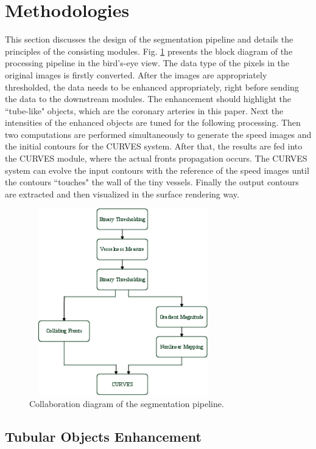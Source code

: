 \section{Methodologies}
\label{sec4_1}

This section discusses the design of the segmentation pipeline and details the principles of the consisting modules.
Fig. \ref{fig:DataFlow} presents the block diagram of the processing pipeline in the bird's-eye view.
The data type of the pixels in the original images is firstly converted.
After the images are appropriately thresholded, the data needs to be enhanced appropriately, right before sending the data to the downstream modules.
The enhancement should highlight the ``tube-like" objects, which are the coronary arteries in this paper.
Next the intensities of the enhanced objects are tuned for the following processing.
Then two computations are performed simultaneously to generate the speed images and the initial contours for the CURVES system.
After that, the results are fed into the CURVES module, where the actual fronts propagation occurs.
The CURVES system can evolve the input contours with the reference of the speed images until the contours ``touches" the wall of the tiny vessels.
Finally the output contours are extracted and then visualized in the surface rendering way.
\begin{figure}[t]
\centering
\includegraphics[height=3.2in,width=3.2in]{Figures/chap04/DataFlow.png}
\caption{Collaboration diagram of the segmentation pipeline.}
\label{fig:DataFlow}
\end{figure}

\subsection{Tubular Objects Enhancement}

